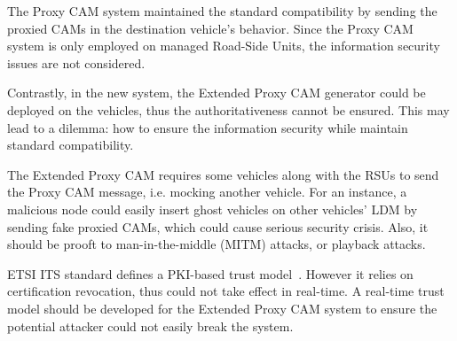 The Proxy CAM system maintained the standard compatibility by sending the proxied CAMs in the destination vehicle's behavior.
Since the Proxy CAM system is only employed on managed Road-Side Units, the information security issues are not considered.

Contrastly, in the new system, the Extended Proxy CAM generator could be deployed on the vehicles, thus the authoritativeness cannot be ensured.
This may lead to a dilemma: how to ensure the information security while maintain standard compatibility.

The Extended Proxy CAM requires some vehicles along with the RSUs to send the Proxy CAM message, i.e. mocking another vehicle.
For an instance, a malicious node could easily insert ghost vehicles on other vehicles' LDM by sending fake proxied CAMs, which could cause serious security crisis.
Also, it should be prooft to man-in-the-middle (MITM) attacks, or playback attacks.

ETSI ITS standard defines a PKI-based trust model~\cite{etsi2013103}. However it relies on certification revocation, thus could not take effect in real-time.
A real-time trust model should be developed for the Extended Proxy CAM system to ensure the potential attacker could not easily break the system.
